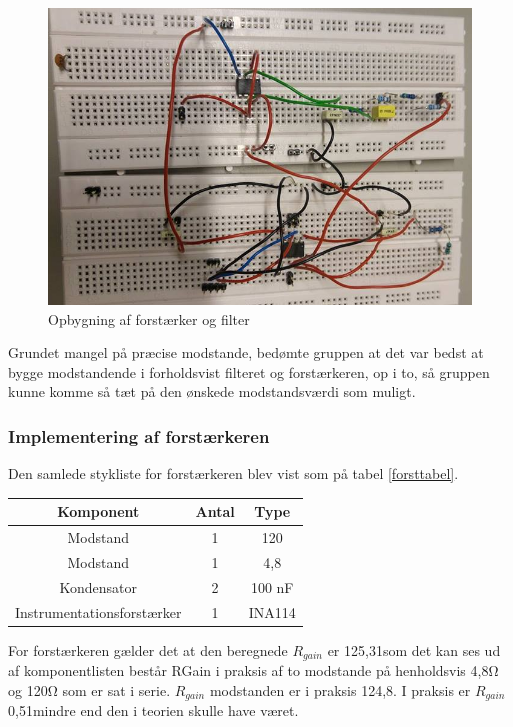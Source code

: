     \begin{figure}[H]
	\centering
	\includegraphics[width=1\textwidth]{Figurer/Hardware/samletopstilling}
	\caption{Opbygning af forstærker og filter}
	\label{samletopbygning}
\end{figure}

Grundet mangel på præcise modstande, bedømte gruppen at det var bedst at bygge modstandende i forholdsvist filteret og forstærkeren, op i to, så gruppen kunne komme så tæt på den ønskede modstandsværdi som muligt. \\

\subsubsection{Implementering af forstærkeren}
Den samlede stykliste for forstærkeren blev vist som på tabel \ref{forsttabel}.

\begin{center}
\begin{tabular}{|c|c|c|}
\hline 
Komponent & Antal & Type \\ 
\hline 
Modstand & 1 & 120\\
\hline
Modstand & 1 & 4,8\\
\hline
Kondensator & 2 & 100 nF\\
\hline
Instrumentationsforstærker & 1 & INA114 \\ 
\hline
\end{tabular} 
\label{forsttabel}
\end{center}

For forstærkeren gælder det at den beregnede $R_{gain}$ er 125,31\Ohm som det kan ses ud af komponentlisten består RGain i praksis af to modstande på henholdsvis 4,8Ω og 120Ω som er sat i serie. $R_{gain}$ modstanden er i praksis 124,8\Ohm. I praksis er $R_{gain}$ 0,51\Ohm mindre end den i teorien skulle have været.

